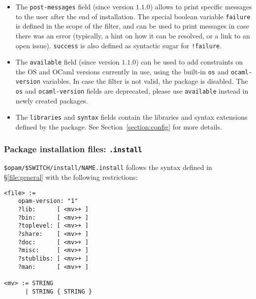 \documentclass[a4paper,11pt]{article}
\begin{document}
\begin{itemize}
\item The {\tt post-messages} field (since version $1.1.0$) allows to print
  specific messages to the user after the end of installation. The special
  boolean variable \verb+failure+ is defined in the scope of the filter, and can
  be used to print messages in case there was an error (typically, a hint on how
  it can be resolved, or a link to an open issue). \verb+success+ is also
  defined as syntactic sugar for \verb+!failure+.

\item The {\tt available} field (since version $1.1.0$) can be used to add
  constraints on the OS and OCaml versions currently in use, using the built-in
  \verb+os+ and \verb+ocaml-version+ variables. In case the filter is not valid,
  the package is disabled. The {\tt os} and {\tt ocaml-version} fields are
  deprecated, please use {\tt available} instead in newly created packages.

\item The {\tt libraries} and {\tt syntax} fields contain the
  libraries and syntax extensions defined by the package. See
  Section~\ref{section:config} for more details.

\end{itemize}

\subsubsection{Package installation files: {\tt *.install}}
\label{file:install}

\verb+$opam/$SWITCH/install/NAME.install+ follows the syntax defined
in \S\ref{file:general} with the following restrictions:

{\small
\begin{Verbatim}[frame=single]
<file> :=
    opam-version: "1"
    ?lib:      [ <mv>+ ]
    ?bin:      [ <mv>+ ]
    ?toplevel: [ <mv>+ ]
    ?share:    [ <mv>+ ]
    ?doc:      [ <mv>+ ]
    ?misc:     [ <mv>+ ]
    ?stublibs: [ <mv>+ ]
    ?man:      [ <mv>+ ]

<mv> := STRING
      | STRING { STRING }
\end{Verbatim}
}
\end{document}
